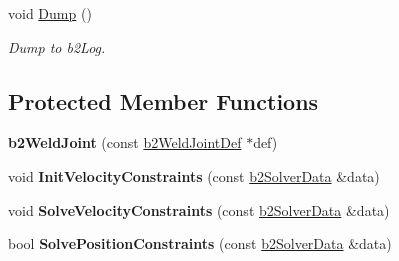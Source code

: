 \begin{DoxyCompactItemize}
\item 
void \hyperlink{classb2_weld_joint_a2fd073c5e6264e98592240308a006981}{Dump} ()\hypertarget{classb2_weld_joint_a2fd073c5e6264e98592240308a006981}{}\label{classb2_weld_joint_a2fd073c5e6264e98592240308a006981}

\begin{DoxyCompactList}\small\item\em Dump to b2\+Log. \end{DoxyCompactList}\end{DoxyCompactItemize}
\subsection*{Protected Member Functions}
\begin{DoxyCompactItemize}
\item 
{\bfseries b2\+Weld\+Joint} (const \hyperlink{structb2_weld_joint_def}{b2\+Weld\+Joint\+Def} $\ast$def)\hypertarget{classb2_weld_joint_a84dbb52e983d9039eab6ad64ae62d8eb}{}\label{classb2_weld_joint_a84dbb52e983d9039eab6ad64ae62d8eb}

\item 
void {\bfseries Init\+Velocity\+Constraints} (const \hyperlink{structb2_solver_data}{b2\+Solver\+Data} \&data)\hypertarget{classb2_weld_joint_aaf86660bd6dc87dc817c7be675b118e4}{}\label{classb2_weld_joint_aaf86660bd6dc87dc817c7be675b118e4}

\item 
void {\bfseries Solve\+Velocity\+Constraints} (const \hyperlink{structb2_solver_data}{b2\+Solver\+Data} \&data)\hypertarget{classb2_weld_joint_a5c30276fbd7ad15f2641bc571fd97596}{}\label{classb2_weld_joint_a5c30276fbd7ad15f2641bc571fd97596}

\item 
bool {\bfseries Solve\+Position\+Constraints} (const \hyperlink{structb2_solver_data}{b2\+Solver\+Data} \&data)\hypertarget{classb2_weld_joint_a21253196937e3f9f6227931dd08d80a3}{}\label{classb2_weld_joint_a21253196937e3f9f6227931dd08d80a3}

\end{DoxyCompactItemize}
